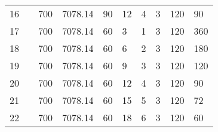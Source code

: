 \begin{table}[htbp]
\begin{tabular}{p{1cm}lp{1cm}p{12mm}p{10mm}p{10mm}p{1cm}lp{1cm}p{1cm}}
    16    &       & 700   & 7078.14 & 90    & 12    & 4     & 3     & 120   & 90 \\
    17    &       & 700   & 7078.14 & 60    & 3     & 1     & 3     & 120   & 360 \\
    18    &       & 700   & 7078.14 & 60    & 6     & 2     & 3     & 120   & 180 \\
    19    &       & 700   & 7078.14 & 60    & 9     & 3     & 3     & 120   & 120 \\
    20    &       & 700   & 7078.14 & 60    & 12    & 4     & 3     & 120   & 90 \\
    21    &       & 700   & 7078.14 & 60    & 15    & 5     & 3     & 120   & 72 \\
    22    &       & 700   & 7078.14 & 60    & 18    & 6     & 3     & 120   & 60 \\
    \bottomrule
    \end{tabular}%
  \label{tab:allExperiments}%
\end{table}%
